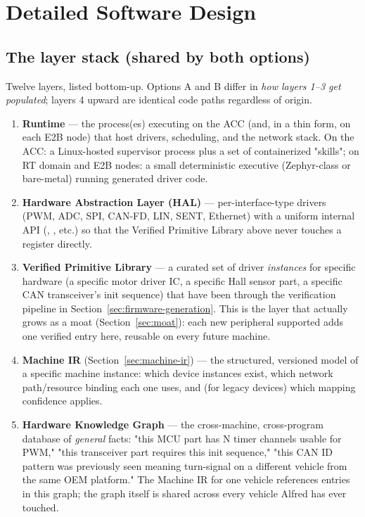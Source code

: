 \section{Detailed Software Design}
\label{sec:software-design}

\subsection{The layer stack (shared by both options)}

Twelve layers, listed bottom-up. Options A and B differ in \emph{how layers 1--3 get populated}; layers 4 upward are identical code paths regardless of origin.

\begin{enumerate}
\item \textbf{Runtime} --- the process(es) executing on the ACC (and, in a thin form, on each E2B node) that host drivers, scheduling, and the network stack. On the ACC: a Linux-hosted supervisor process plus a set of containerized "skills"; on RT domain and E2B nodes: a small deterministic executive (Zephyr-class or bare-metal) running generated driver code.
\item \textbf{Hardware Abstraction Layer (HAL)} --- per-interface-type drivers (PWM, ADC, SPI, CAN-FD, LIN, SENT, Ethernet) with a uniform internal API (, , etc.) so that the Verified Primitive Library above never touches a register directly.
\item \textbf{Verified Primitive Library} --- a curated set of driver \emph{instances} for specific hardware (a specific motor driver IC, a specific Hall sensor part, a specific CAN transceiver's init sequence) that have been through the verification pipeline in Section~\ref{sec:firmware-generation}. This is the layer that actually grows as a moat (Section~\ref{sec:moat}): each new peripheral supported adds one verified entry here, reusable on every future machine.
\item \textbf{Machine IR} (Section~\ref{sec:machine-ir}) --- the structured, versioned model of a specific machine instance: which device instances exist, which network path/resource binding each one uses, and (for legacy devices) which mapping confidence applies.
\item \textbf{Hardware Knowledge Graph} --- the cross-machine, cross-program database of \emph{general} facts: "this MCU part has N timer channels usable for PWM," "this transceiver part requires this init sequence," "this CAN ID pattern was previously seen meaning turn-signal on a different vehicle from the same OEM platform." The Machine IR for one vehicle references entries in this graph; the graph itself is shared across every vehicle Alfred has ever touched.

\end{enumerate}
